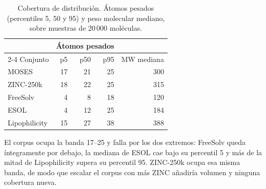 \begin{table}[htbp]
  \centering
  \caption{Cobertura de distribución. Átomos pesados (percentiles 5, 50 y 95)
           y peso molecular mediano, sobre muestras de 20\,000 moléculas.}
  \label{tab:a3-cobertura}
  \small
  \begin{tabular}{@{}lrrrr@{}}
    \toprule
    & \multicolumn{3}{c}{Átomos pesados} & \\
    \cmidrule(lr){2-4}
    Conjunto & p5 & p50 & p95 & MW mediana \\
    \midrule
    MOSES         & 17 & 21 & 25 & 300 \\
    ZINC-250k     & 18 & 22 & 25 & 315 \\
    \midrule
    FreeSolv      &  4 &  8 & 18 & 120 \\
    ESOL          &  4 & 12 & 25 & 184 \\
    Lipophilicity & 15 & 27 & 38 & 388 \\
    \bottomrule
  \end{tabular}

  \vspace{0.5em}
  \begin{minipage}{0.92\textwidth}
    \footnotesize
    El corpus ocupa la banda 17--25 y falla por los dos extremos: FreeSolv queda
    íntegramente por debajo, la mediana de ESOL cae bajo su percentil 5 y más de la
    mitad de Lipophilicity supera su percentil 95. ZINC-250k ocupa esa misma banda, de
    modo que escalar el corpus con más ZINC añadiría volumen y ninguna cobertura nueva.
  \end{minipage}
\end{table}



